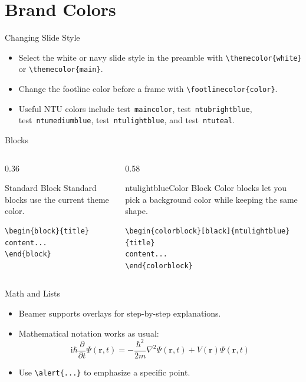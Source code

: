 \documentclass{beamer}
\newcommand{\testcolor}[1]{\colorbox{#1}{\textcolor{#1}{test}}~\texttt{#1}}
\begin{document}
\section{Brand Colors}

\begin{frame}[fragile]{Changing Slide Style}
\begin{itemize}
\item Select the white or navy slide style in the preamble with
\verb|\themecolor{white}| or \verb|\themecolor{main}|.
\item Change the footline color before a frame with \verb|\footlinecolor{color}|.
\item Useful NTU colors include \testcolor{maincolor}, \testcolor{ntubrightblue},
\testcolor{ntumediumblue}, \testcolor{ntulightblue}, and \testcolor{ntuteal}.
\end{itemize}
\end{frame}

\footlinecolor{}
\begin{frame}[fragile]{Blocks}
\begin{columns}
\begin{column}{0.36\textwidth}
\begin{block}{Standard Block}
Standard blocks use the current theme color.
\begin{verbatim}
\begin{block}{title}
content...
\end{block}
\end{verbatim}
\end{block}
\end{column}
\begin{column}{0.58\textwidth}
\begin{colorblock}[black]{ntulightblue}{Color Block}
Color blocks let you pick a background color while keeping the same shape.
\scriptsize
\begin{verbatim}
\begin{colorblock}[black]{ntulightblue}{title}
content...
\end{colorblock}
\end{verbatim}
\end{colorblock}
\end{column}
\end{columns}
\end{frame}

\begin{frame}{Math and Lists}
\begin{itemize}[<+->]
\item Beamer supports overlays for step-by-step explanations.
\item Mathematical notation works as usual:
\begin{equation*}
\mathrm{i}\hbar\frac{\partial}{\partial t}\Psi(\mathbf{r},t)=
-\frac{\hbar^2}{2m}\nabla^2\Psi(\mathbf{r},t)+V(\mathbf{r})\Psi(\mathbf{r},t)
\end{equation*}
\item Use \texttt{\textbackslash alert\{...\}} to emphasize a \alert{specific point}.
\end{itemize}
\end{frame}
\end{document}
